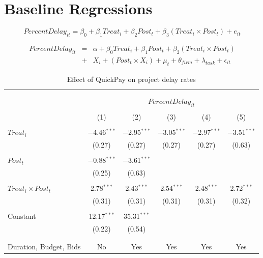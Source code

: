 \documentclass[
]{article}
\begin{document}
\hypertarget{baseline-regressions}{%
\section{Baseline Regressions}\label{baseline-regressions}}

\[ PercentDelay_{it} = \beta_0 + \beta_1 Treat_i + \beta_2 Post_t + \beta_3 (Treat_i \times Post_t) + e_{it}\]

\[ \begin{aligned} PercentDelay_{it} &=& \alpha+\beta_0 Treat_i + \beta_1 Post_t + \beta_2 (Treat_i \times Post_t)\\
&+&  X_i + (Post_t \times X_i) + \mu_t + \theta_{firm} + \lambda_{task}+ \epsilon_{it}
\end{aligned}\]

\begin{table}[H] \centering 
  \caption{Effect of QuickPay on project delay rates} 
  \label{} 
\small 
\begin{tabular}{@{\extracolsep{-2pt}}lccccc} 
\\[-1.8ex]\hline 
\hline \\[-1.8ex] 
\\[-1.8ex] & \multicolumn{5}{c}{$PercentDelay_{it}$} \\ 
\\[-1.8ex] & (1) & (2) & (3) & (4) & (5)\\ 
\hline \\[-1.8ex] 
 $Treat_i$ & $-$4.46$^{***}$ & $-$2.95$^{***}$ & $-$3.05$^{***}$ & $-$2.97$^{***}$ & $-$3.51$^{***}$ \\ 
  & (0.27) & (0.27) & (0.27) & (0.27) & (0.63) \\ 
  & & & & & \\ 
 $Post_t$ & $-$0.88$^{***}$ & $-$3.61$^{***}$ &  &  &  \\ 
  & (0.25) & (0.63) &  &  &  \\ 
  & & & & & \\ 
 $Treat_i \times Post_t$ & 2.78$^{***}$ & 2.43$^{***}$ & 2.54$^{***}$ & 2.48$^{***}$ & 2.72$^{***}$ \\ 
  & (0.31) & (0.31) & (0.31) & (0.31) & (0.32) \\ 
  & & & & & \\ 
 Constant & 12.17$^{***}$ & 35.31$^{***}$ &  &  &  \\ 
  & (0.22) & (0.54) &  &  &  \\ 
  & & & & & \\ 
\hline \\[-1.8ex] 
Duration, Budget, Bids & No & Yes & Yes & Yes & Yes \\ 

\end{tabular}
\end{table}
\end{document}
